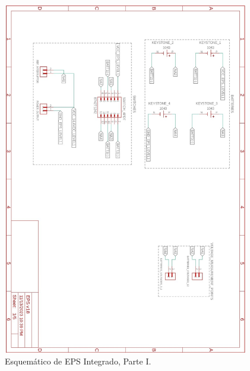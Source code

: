 \begin{figure}[h]
  \centering
  \includegraphics[width=0.955\textwidth]{Pictures/EPS_Sheets_page-0001.jpg}
  \caption{Esquemático de EPS Integrado, Parte I.}
  \label{fig:EPS_Sheet1}
\end{figure}
\newpage

